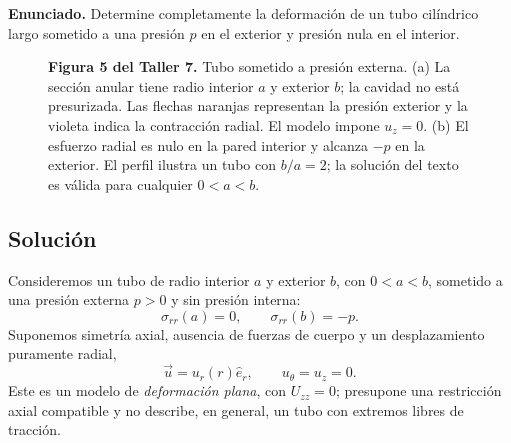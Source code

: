 \documentclass[a4paper]{article}
\begin{document}
\textbf{Enunciado.} Determine completamente la deformación de un tubo cilíndrico largo sometido a una presión $p$ en el exterior y presión nula en el interior.

\begin{figure}[H]
\centering

\par\medskip
\begin{minipage}{\textwidth}
\textbf{Figura 5 del Taller 7.} Tubo sometido a presión externa. (a) La sección anular tiene radio interior $a$ y exterior $b$; la cavidad no está presurizada. Las flechas naranjas representan la presión exterior y la violeta indica la contracción radial. El modelo impone $u_z=0$. (b) El esfuerzo radial es nulo en la pared interior y alcanza $-p$ en la exterior. El perfil ilustra un tubo con $b/a=2$; la solución del texto es válida para cualquier $0<a<b$.
\end{minipage}
\end{figure}

\subsection{Solución}

Consideremos un tubo de radio interior $a$ y exterior $b$, con $0<a<b$, sometido a una presión externa $p>0$ y sin presión interna:
\[
\sigma_{rr}(a)=0,
\qquad \sigma_{rr}(b)=-p.
\]
Suponemos simetría axial, ausencia de fuerzas de cuerpo y un desplazamiento puramente radial,
\[
\vec u=u_r(r)\hat e_r,
\qquad u_\theta=u_z=0.
\]
Este es un modelo de \emph{deformación plana}, con $U_{zz}=0$; presupone una restricción axial compatible y no describe, en general, un tubo con extremos libres de tracción.
\end{document}

